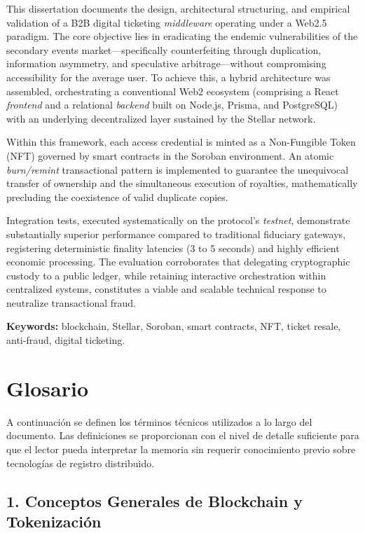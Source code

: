 This dissertation documents the design, architectural structuring, and empirical validation of a B2B digital 
ticketing \textit{middleware} operating under a Web2.5 paradigm. The core objective lies in eradicating the 
endemic vulnerabilities of the secondary events market—specifically counterfeiting through duplication, 
information asymmetry, and speculative arbitrage—without compromising accessibility for the average user. 
To achieve this, a hybrid architecture was assembled, orchestrating a conventional Web2 ecosystem (comprising 
a React \textit{frontend} and a relational \textit{backend} built on Node.js, Prisma, and PostgreSQL) with an 
underlying decentralized layer sustained by the Stellar network.

Within this framework, each access credential is minted as a Non-Fungible Token (NFT) governed by smart 
contracts in the Soroban environment. An atomic \textit{burn/remint} transactional pattern is implemented 
to guarantee the unequivocal transfer of ownership and the simultaneous execution of royalties,
mathematically 
precluding the coexistence of valid duplicate copies. 

Integration tests, executed systematically on the protocol's \textit{testnet}, demonstrate substantially
superior 
performance compared to traditional fiduciary gateways, registering deterministic finality latencies (3 to 5
seconds) 
and highly efficient economic processing. The evaluation corroborates that delegating cryptographic custody
to a public 
ledger, while retaining interactive orchestration within centralized systems, constitutes a viable and
scalable technical
response to neutralize transactional fraud.

\vspace{0.3cm}
\noindent\textbf{Keywords:} blockchain, Stellar, Soroban, smart contracts, NFT, ticket resale, anti-fraud,
digital ticketing.

\newpage
\section*{Glosario}

A continuación se definen los términos técnicos utilizados a lo largo del documento. Las definiciones se
proporcionan con el nivel de detalle suficiente para que el lector pueda interpretar la memoria sin requerir
conocimiento previo sobre tecnologías de registro distribuido.

\subsection*{1. Conceptos Generales de Blockchain y Tokenización}

